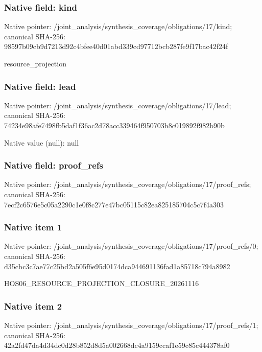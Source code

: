 \documentclass[10pt,a4paper]{article}
\begin{document}
\subsubsection{Native field: kind}
Native pointer: /joint\_\allowbreak{}analysis/synthesis\_\allowbreak{}coverage/obligations/17/kind; canonical SHA-256: 98597b09cb9d7213d92c4bfee40d01abd339cd97712bcb287fe9f17bac42f24f

\begingroup\raggedright\sloppy resource\_\allowbreak{}projection\par\endgroup

\subsubsection{Native field: lead}
Native pointer: /joint\_\allowbreak{}analysis/synthesis\_\allowbreak{}coverage/obligations/17/lead; canonical SHA-256: 74234e98afe7498fb5daf1f36ac2d78acc339464f950703b8c019892f982b90b

Native value (null): null

\subsubsection{Native field: proof\_\allowbreak{}refs}
Native pointer: /joint\_\allowbreak{}analysis/synthesis\_\allowbreak{}coverage/obligations/17/proof\_\allowbreak{}refs; canonical SHA-256: 7ecf2c6576e5c05a2290c1e0f8c277e47bc05115c82ea825185704c5c7f4a303

\subsubsection{Native item 1}
Native pointer: /joint\_\allowbreak{}analysis/synthesis\_\allowbreak{}coverage/obligations/17/proof\_\allowbreak{}refs/0; canonical SHA-256: d35cbc3c7ae77c25bd2a505f6e95d0174dca944691136fad1a85718c794a8982

\begingroup\raggedright\sloppy HOS06\_\allowbreak{}RESOURCE\_\allowbreak{}PROJECTION\_\allowbreak{}CLOSURE\_\allowbreak{}20261116\par\endgroup

\subsubsection{Native item 2}
Native pointer: /joint\_\allowbreak{}analysis/synthesis\_\allowbreak{}coverage/obligations/17/proof\_\allowbreak{}refs/1; canonical SHA-256: 42a2fd47da4d34dc0d28b852d8d5a002668dc4a9159ccaf1e59c85c444378af0
\end{document}

